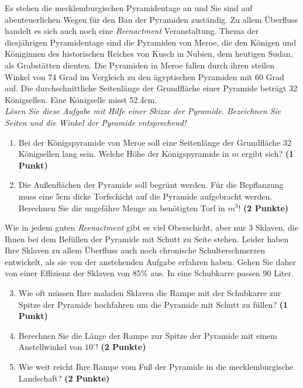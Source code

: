 \documentclass[a4paper, 9pt]{scrartcl}\usepackage[]{graphicx}\usepackage[]{xcolor}
\begin{document}
Es stehen die mecklemburgischen Pyramidentage an und Sie sind auf
abenteuerlichen Wegen f{\"u}r den Bau der Pyramiden zust{\"a}ndig. Zu allem
{\"U}berfluss handelt es sich auch noch eine \textit{Reenactment}
Veranstaltung. Thema der diesj{\"a}hrigen Pyramidentage sind die Pyramiden von
Meroe, die den K{\"o}nigen und K{\"o}niginnen des historischen Reiches von Kusch in
Nubien, dem heutigen Sudan, als Grabst{\"a}tten dienten. Die Pyramiden in Meroe
fallen durch ihren steilen Winkel von 74 Grad im Vergleich zu
den {\"a}gyptischen Pyramiden mit 60 Grad auf. Die durchschnittliche
Seitenl{\"a}nge der Grundfl{\"a}che einer Pyramide betr{\"a}gt 32 K{\"o}nigsellen. Eine K{\"o}nigselle
misst 52.4cm.\\

\textit{L{\"o}sen Sie diese Aufgabe mit Hilfe einer Skizze der Pyramide. Bezeichnen
  Sie Seiten und die Winkel der Pyramide entsprechend!}

\begin{enumerate}
\item Bei der K{\"o}nigspyramide von Meroe soll eine Seitenl{\"a}nge der Grundfl{\"a}che
  32 K{\"o}nigsellen lang sein. Welche H{\"o}he der K{\"o}nigspyramide in $m$
  ergibt sich? \textbf{(1 Punkt)}
\item Die Au{\ss}enfl{\"a}chen der Pyramide soll begr{\"u}nt werden. F{\"u}r die
  Bepflanzung muss eine 5cm dicke Torfschicht auf die
  Pyramide aufgebracht werden. Berechnen Sie die ungef{\"a}hre Menge an
  ben{\"o}tigten Torf in $m^3$! \textbf{(2 Punkte)}
\end{enumerate}

Wie in jedem guten \textit{Reenactment} gibt es viel Oberschicht, aber nur
3 Sklaven, die Ihnen bei dem Bef{\"u}llen der Pyramide mit Schutt
zu Seite stehen. Leider haben Ihre Sklaven zu allem {\"U}berfluss auch noch
chronische Schulterschmerzen entwickelt, als sie von der
anstehenden Aufgabe erfahren haben. Gehen Sie daher von einer Effizienz der
Sklaven von 85\% aus. In eine Schubkarre passen
90 Liter.

\begin{enumerate}
  \setcounter{enumi}{2}
\item Wie oft m{\"u}ssen Ihre maladen Sklaven die Rampe mit der Schubkarre
  zur Spitze der Pyramide hochfahren um die Pyramide mit Schutt zu f{\"u}llen? \textbf{(1 Punkt)}
\item Berechnen Sie die L{\"a}nge der Rampe zur Spitze der Pyramide mit einem
  Anstellwinkel von $10^\circ$! \textbf{(2 Punkte)}
\item Wie weit reicht Ihre Rampe vom Fu{\ss} der Pyramide in die mecklemburgische
  Landschaft?  \textbf{(2 Punkte)}
\end{enumerate}
\end{document}
